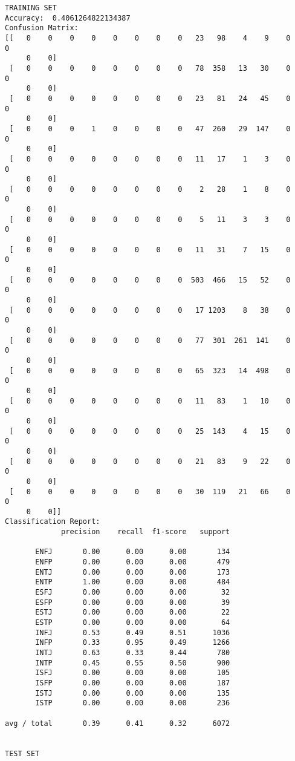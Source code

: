 \documentclass[11pt]{article}
\begin{document}
    \begin{Verbatim}[commandchars=\\\{\}]
TRAINING SET
Accuracy:  0.4061264822134387
Confusion Matrix:
[[   0    0    0    0    0    0    0    0   23   98    4    9    0    0
     0    0]
 [   0    0    0    0    0    0    0    0   78  358   13   30    0    0
     0    0]
 [   0    0    0    0    0    0    0    0   23   81   24   45    0    0
     0    0]
 [   0    0    0    1    0    0    0    0   47  260   29  147    0    0
     0    0]
 [   0    0    0    0    0    0    0    0   11   17    1    3    0    0
     0    0]
 [   0    0    0    0    0    0    0    0    2   28    1    8    0    0
     0    0]
 [   0    0    0    0    0    0    0    0    5   11    3    3    0    0
     0    0]
 [   0    0    0    0    0    0    0    0   11   31    7   15    0    0
     0    0]
 [   0    0    0    0    0    0    0    0  503  466   15   52    0    0
     0    0]
 [   0    0    0    0    0    0    0    0   17 1203    8   38    0    0
     0    0]
 [   0    0    0    0    0    0    0    0   77  301  261  141    0    0
     0    0]
 [   0    0    0    0    0    0    0    0   65  323   14  498    0    0
     0    0]
 [   0    0    0    0    0    0    0    0   11   83    1   10    0    0
     0    0]
 [   0    0    0    0    0    0    0    0   25  143    4   15    0    0
     0    0]
 [   0    0    0    0    0    0    0    0   21   83    9   22    0    0
     0    0]
 [   0    0    0    0    0    0    0    0   30  119   21   66    0    0
     0    0]]
Classification Report:
             precision    recall  f1-score   support

       ENFJ       0.00      0.00      0.00       134
       ENFP       0.00      0.00      0.00       479
       ENTJ       0.00      0.00      0.00       173
       ENTP       1.00      0.00      0.00       484
       ESFJ       0.00      0.00      0.00        32
       ESFP       0.00      0.00      0.00        39
       ESTJ       0.00      0.00      0.00        22
       ESTP       0.00      0.00      0.00        64
       INFJ       0.53      0.49      0.51      1036
       INFP       0.33      0.95      0.49      1266
       INTJ       0.63      0.33      0.44       780
       INTP       0.45      0.55      0.50       900
       ISFJ       0.00      0.00      0.00       105
       ISFP       0.00      0.00      0.00       187
       ISTJ       0.00      0.00      0.00       135
       ISTP       0.00      0.00      0.00       236

avg / total       0.39      0.41      0.32      6072


TEST SET

    \end{Verbatim}
\end{document}

